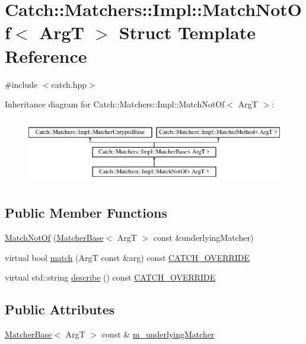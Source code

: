 \hypertarget{structCatch_1_1Matchers_1_1Impl_1_1MatchNotOf}{\section{Catch\-:\-:Matchers\-:\-:Impl\-:\-:Match\-Not\-Of$<$ Arg\-T $>$ Struct Template Reference}
\label{structCatch_1_1Matchers_1_1Impl_1_1MatchNotOf}
}


{\ttfamily \#include $<$catch.\-hpp$>$}

Inheritance diagram for Catch\-:\-:Matchers\-:\-:Impl\-:\-:Match\-Not\-Of$<$ Arg\-T $>$\-:\begin{figure}[H]
\begin{center}
\leavevmode
\includegraphics[height=2.926829cm]{structCatch_1_1Matchers_1_1Impl_1_1MatchNotOf}
\end{center}
\end{figure}
\subsection*{Public Member Functions}
\begin{DoxyCompactItemize}
\item 
\hyperlink{structCatch_1_1Matchers_1_1Impl_1_1MatchNotOf_a47afdd9e4c3354cef85adc3186097ae4}{Match\-Not\-Of} (\hyperlink{structCatch_1_1Matchers_1_1Impl_1_1MatcherBase}{Matcher\-Base}$<$ Arg\-T $>$ const \&underlying\-Matcher)
\item 
virtual bool \hyperlink{structCatch_1_1Matchers_1_1Impl_1_1MatchNotOf_a1b9ad6566e4ab0f292d2903f557307cc}{match} (Arg\-T const \&arg) const \hyperlink{catch_8hpp_a8ecdce4d3f57835f707915ae831eb847}{C\-A\-T\-C\-H\-\_\-\-O\-V\-E\-R\-R\-I\-D\-E}
\item 
virtual std\-::string \hyperlink{structCatch_1_1Matchers_1_1Impl_1_1MatchNotOf_a62bdc7dcb9ff000438a4ed3d5483a248}{describe} () const \hyperlink{catch_8hpp_a8ecdce4d3f57835f707915ae831eb847}{C\-A\-T\-C\-H\-\_\-\-O\-V\-E\-R\-R\-I\-D\-E}
\end{DoxyCompactItemize}
\subsection*{Public Attributes}
\begin{DoxyCompactItemize}
\item 
\hyperlink{structCatch_1_1Matchers_1_1Impl_1_1MatcherBase}{Matcher\-Base}$<$ Arg\-T $>$ const \& \hyperlink{structCatch_1_1Matchers_1_1Impl_1_1MatchNotOf_af7ac67f112b0e93796b048a47329aad4}{m\-\_\-underlying\-Matcher}
\end{DoxyCompactItemize}
